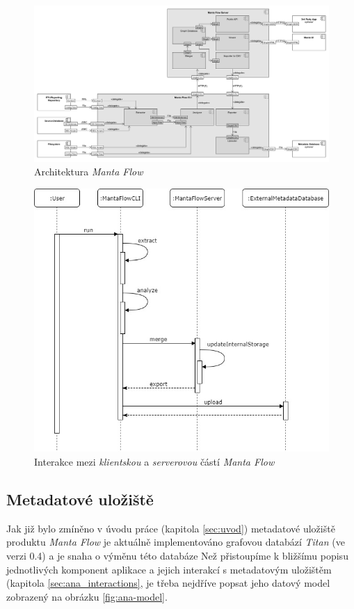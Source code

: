 \begin{figure}
\begin{center}
\includegraphics[width=14cm]{figures/flow_comp}
\caption{Architektura \textit{Manta Flow}}
\label{fig:ana-flow-comp}
\end{center}
\end{figure}

\begin{figure}
\begin{center}
\includegraphics[width=14cm]{figures/flow_seq}
\caption{Interakce mezi \textit{klientskou} a \textit{serverovou} částí \textit{Manta Flow}}
\label{fig:ana-flow-seq}
\end{center}
\end{figure}

\subsection{Metadatové uložiště}
Jak již bylo zmíněno v úvodu práce (kapitola \ref{sec:uvod}) metadatové uložiště produktu \textit{Manta Flow} je aktuálně implementováno grafovou databází \textit{Titan} (ve verzi 0.4) a je snaha o výměnu této databáze %
Než přistoupíme k bližšímu popisu jednotlivých komponent aplikace a jejich interakcí s metadatovým uložištěm (kapitola \ref{sec:ana_interactions}, je třeba nejdříve popsat jeho datový model zobrazený na obrázku \ref{fig:ana-model}. 

